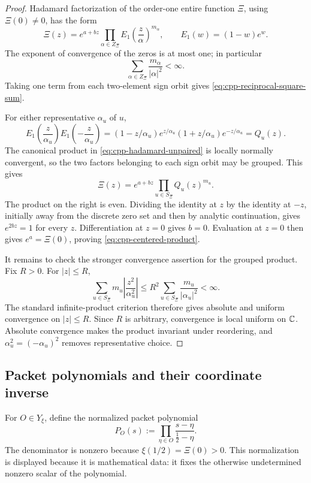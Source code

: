 \begin{proof}
Hadamard factorization of the order-one entire function \(\Xi\), using
\(\Xi(0)\ne0\), has the form
\begin{equation}
\label{eq:cpp-hadamard-unpaired}
 \Xi(z)
 =
 e^{a+bz}
 \prod_{\alpha\in Z_\Xi}
 E_1\!\left(\frac z\alpha\right)^{m_\alpha},
 \qquad
 E_1(w)=(1-w)e^w.
\end{equation}
The exponent of convergence of the zeros is at most one; in particular
\[
 \sum_{\alpha\in Z_\Xi}\frac{m_\alpha}{|\alpha|^2}<\infty.
\]
Taking one term from each two-element sign orbit gives
\eqref{eq:cpp-reciprocal-square-sum}.

For either representative \(\alpha_u\) of \(u\),
\begin{equation}
\label{eq:cpp-E1-pair}
 E_1\!\left(\frac z{\alpha_u}\right)
 E_1\!\left(-\frac z{\alpha_u}\right)
 =
 (1-z/\alpha_u)e^{z/\alpha_u}
 (1+z/\alpha_u)e^{-z/\alpha_u}
 =
 Q_u(z).
\end{equation}
The canonical product in \eqref{eq:cpp-hadamard-unpaired} is locally normally
convergent, so the two factors belonging to each sign orbit may be grouped.
This gives
\[
 \Xi(z)=e^{a+bz}\prod_{u\in S_\Xi}Q_u(z)^{m_u}.
\]
The product on the right is even.  Dividing the identity at \(z\) by the
identity at \(-z\), initially away from the discrete zero set and then by
analytic continuation, gives \(e^{2bz}=1\) for every \(z\).  Differentiation at
\(z=0\) gives \(b=0\).  Evaluation at \(z=0\) then gives
\(e^a=\Xi(0)\), proving \eqref{eq:cpp-centered-product}.

It remains to check the stronger convergence assertion for the grouped
product.  Fix \(R>0\).  For \(|z|\leq R\),
\[
 \sum_{u\in S_\Xi}
 m_u\left|\frac{z^2}{\alpha_u^2}\right|
 \leq
 R^2\sum_{u\in S_\Xi}\frac{m_u}{|\alpha_u|^2}<\infty.
\]
The standard infinite-product criterion therefore gives absolute and uniform
convergence on \(|z|\leq R\).  Since \(R\) is arbitrary, convergence is local
uniform on \(\mathbb C\).  Absolute convergence makes the product invariant under
reordering, and \(\alpha_u^2=(-\alpha_u)^2\) removes representative choice.
\end{proof}

\subsection{Packet polynomials and their coordinate inverse}

For \(O\in Y_\xi\), define the normalized packet polynomial
\begin{equation}
\label{eq:cpp-packet-polynomial}
 P_O(s)
 :=
 \prod_{\eta\in O}
 \frac{s-\eta}{\frac12-\eta}.
\end{equation}
The denominator is nonzero because
\(\xi(1/2)=\Xi(0)>0\).  This normalization is displayed because it is
mathematical data: it fixes the otherwise undetermined nonzero scalar of the
polynomial.

